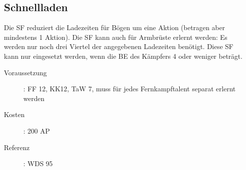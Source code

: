 \subsection{Schnellladen}
\label{sf.schnellladen}
Die SF  reduziert die Ladezeiten für Bögen um eine Aktion (betragen aber mindestens 1 Aktion).
Die SF kann auch für Armbrüste erlernt werden: Es werden nur noch drei Viertel der angegebenen Ladezeiten benötigt.
Diese SF kann nur eingesetzt werden, wenn die BE des Kämpfers 4 oder weniger beträgt.
\begin{description}
    \item[Voraussetzung]:
        FF 12, KK12, TaW  7, muss für jedes Fernkampftalent separat erlernt werden
    \item [Kosten]:
        200 AP
    \item [Referenz]:
        WDS 95
\end{description}

